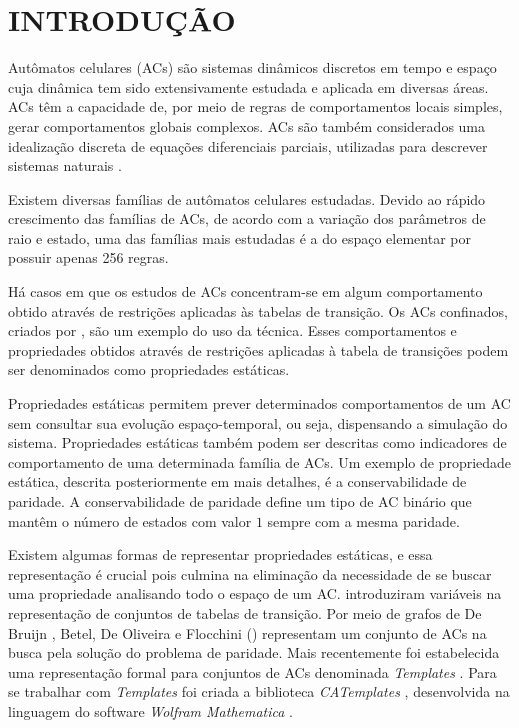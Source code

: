 \section{INTRODUÇÃO}
\label{sec:introducao}

Autômatos celulares (ACs) são sistemas dinâmicos discretos em tempo e espaço cuja dinâmica tem sido extensivamente estudada e aplicada em diversas áreas. %
ACs têm a capacidade de, por meio de regras de comportamentos locais simples, gerar comportamentos globais complexos. %
ACs são também considerados uma idealização discreta de equações diferenciais parciais, utilizadas para descrever sistemas naturais \cite{wolfram1994cellular}.

Existem diversas famílias de autômatos celulares estudadas. Devido ao rápido crescimento das famílias de ACs, de acordo com a variação dos parâmetros de raio %
e estado, uma das famílias mais estudadas é a do espaço elementar por possuir apenas 256 regras.

Há casos em que os estudos de ACs concentram-se em algum comportamento obtido através de restrições aplicadas às tabelas de transição. Os ACs confinados, criados por , são um exemplo do uso da técnica. Esses comportamentos e propriedades obtidos através de restrições aplicadas à tabela de transições podem ser denominados como propriedades estáticas.

Propriedades estáticas permitem prever determinados comportamentos de um AC sem consultar sua evolução espaço-temporal, ou seja, dispensando a simulação do sistema. Propriedades estáticas também podem ser descritas como indicadores de comportamento de uma determinada família de ACs. Um exemplo de propriedade estática, descrita posteriormente em mais detalhes, é a conservabilidade de paridade. A conservabilidade de paridade define um tipo de AC binário que mantêm o número de estados com valor $1$ sempre com a mesma paridade.%

Existem algumas formas de representar propriedades estáticas, e essa representação é crucial pois culmina na eliminação da necessidade de se buscar uma propriedade analisando todo o espaço de um AC.  introduziram variáveis na representação de conjuntos de tabelas de transição. Por meio de grafos de De Bruijn \cite{Bruijn946combinatorial}, Betel, De Oliveira e Flocchini (\citeyear{Betel2013}) representam um conjunto de ACs na busca pela solução do problema de paridade. Mais recentemente foi estabelecida uma representação formal para conjuntos de ACs denominada \textit{Templates} \cite{deOliveira2014,deOliveira2014b}. Para se trabalhar com  \textit{Templates} foi criada a biblioteca \textit{CATemplates} \cite{CATemplates}, desenvolvida na linguagem do software \textit{Wolfram Mathematica} \cite{woframMathematica10}.

